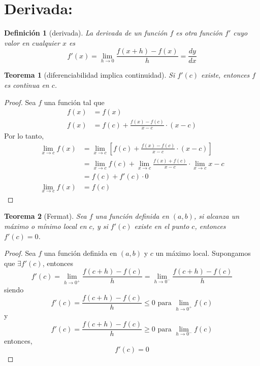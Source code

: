 \documentclass{report}
\newtheorem*{theorem}{Teorema}
\newtheorem*{definition}{Definición}
\begin{document}
  \chapter*{Derivada:}
    \begin{definition}[derivada]
      La derivada de un función $f$ es otra función $f'$ cuyo valor en cualquier
      $x$ es
      \begin{equation*}
        f'(x)=\lim_{h\to 0}\frac{f(x+h)-f(x)}{h}=\frac{dy}{dx}
      \end{equation*}
    \end{definition}
    \begin{theorem}[diferenciabilidad implica continuidad]
      Si $f'(c)$ existe, entonces $f$ es continua en $c$.
    \end{theorem}
    \begin{proof}
      Sea $f$ una función tal que
      \begin{align*}
        f(x)&=f(x)\\
        f(x)&=f(c)+\frac{f(x)-f(c)}{x-c}\cdot(x-c)
      \end{align*}
      Por lo tanto,
      \begin{align*}
        \lim_{x\to c}f(x)&=\lim_{x\to c}\left[f(c)+\frac{f(x)-f(c)}{x-c}\cdot(x-c)\right]\\
                         &=\lim_{x\to c}f(c)+\lim_{x\to c}\frac{f(x)+f(c)}{x-c}\cdot
                         \lim_{x\to c}x-c\\
                         &=f(c)+f'(c)\cdot0\\
        \lim_{x\to c}f(x)&=f(c)
      \end{align*}
    \end{proof}
    \begin{theorem}[Fermat]
      Sea $f$ una función definida en $(a,b)$, si alcanza un máximo o mínimo local en $c$, y 
      si $f'(c)$ existe en el punto $c$, entonces $f'(c)=0$.
    \end{theorem}
    \begin{proof}
      Sea $f$ una función definida en $(a,b)$ y $c$ un máximo local.
      Supongamos que $\exists f'(c)$, entonces
      \begin{equation*}
        f'(c)=\lim_{h\to 0^+}\frac{f(c+h)-f(c)}{h}=\lim_{h\to 0^-}\frac{f(c+h)-f(c)}{h}
      \end{equation*}
      siendo
      \begin{equation*}
        f'(c)=\frac{f(c+h)-f(c)}{h}\leqslant0\text{ para }\lim_{h\to0^+}f(c)
      \end{equation*}
      y
      \begin{equation*}
        f'(c)=\frac{f(c+h)-f(c)}{h}\geqslant0\text{ para }\lim_{h\to0^-}f(c)
      \end{equation*}
      entonces,
      \begin{equation*}
        f'(c)=0
      \end{equation*}
    \end{proof}
\end{document}
